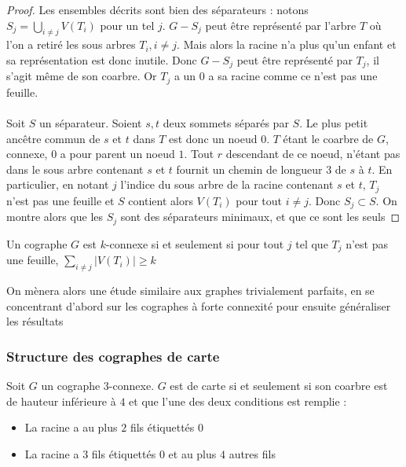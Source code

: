 \documentclass{scrartcl}
\begin{document}
\begin{flushleft}
\begin{proof}
    Les ensembles décrits sont bien des séparateurs : notons $\displaystyle S_j = \bigcup_{i \neq j} V(T_i)$ pour un tel $j$. $G - S_j$ peut être
    représenté par l'arbre $T$ où l'on a retiré les sous arbres $T_i, i \neq j$. Mais alors la racine n'a plus qu'un enfant et sa représentation est donc
    inutile. Donc $G - S_j$ peut être représenté par $T_j$, il s'agit même de son coarbre. Or $T_j$ a un $0$ a sa racine comme ce n'est pas une feuille.
    \\~\\
    Soit $S$ un séparateur. Soient $s, t$ deux sommets séparés par $S$. Le plus petit ancêtre commun de $s$ et $t$ dans $T$
    est donc un noeud $0$. $T$ étant le coarbre de $G$, connexe, $0$ a pour parent un noeud $1$. Tout $r$ descendant de ce noeud, n'étant pas dans le
    sous arbre contenant $s$ et $t$ fournit un chemin de longueur $3$ de $s$ à $t$. En particulier, en notant $j$ l'indice du sous arbre de la racine
    contenant $s$ et $t$, $T_j$ n'est pas une feuille et $S$ contient alors $V(T_i)$ pour tout $i \neq j$. Donc $S_j \subset S$. On montre
    alors que les $S_j$ sont des séparateurs minimaux, et que ce sont les seuls
\end{proof}

\begin{cor}\label{coarbrekconn}
    Un cographe $G$ est $k$-connexe si et seulement si pour tout $j$ tel que $T_j$ n'est pas une feuille, $\sum_{i \neq j} |V(T_i)| \geq k$
\end{cor}

On mènera alors une étude similaire aux graphes trivialement parfaits, en se concentrant d'abord sur les cographes à forte connexité pour ensuite
généraliser les résultats

\subsubsection{Structure des cographes de carte}

\begin{theorem}\label{cograph3conn}
    Soit $G$ un cographe $3$-connexe. $G$ est de carte si et seulement si son coarbre est de hauteur inférieure à $4$ et que l'une des deux
    conditions est remplie :
    \begin{itemize}
        \item La racine a au plus $2$ fils étiquettés $0$
        \item La racine a $3$ fils étiquettés $0$ et au plus $4$ autres fils 
    \end{itemize}
\end{theorem}


\end{flushleft}
\end{document}

